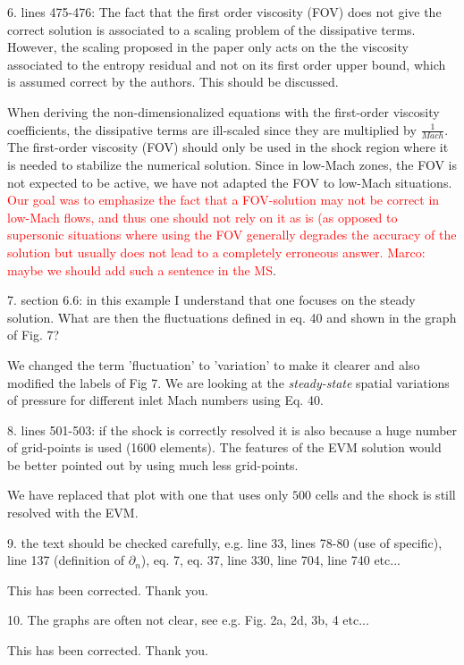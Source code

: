 \documentclass{article}
\newcommand{\tcr}[1]{\textcolor{red}{#1}}
\begin{document}
{
\color{blue}
6. lines 475-476: The fact that the first order viscosity (FOV)  does not give the correct solution is associated to a scaling problem of the dissipative terms. However, the scaling proposed in the paper only acts on the the viscosity associated to the entropy residual and not on its first order upper bound, which is assumed correct by the authors. This should be discussed.
}

When deriving the non-dimensionalized equations with the first-order viscosity coefficients, the dissipative terms are ill-scaled since they are multiplied by $\frac{1}{Mach}$. The first-order viscosity (FOV) should only be used in the shock region where it is needed to stabilize the numerical solution. Since in low-Mach zones, the FOV is not expected to be active, we have not adapted the FOV to low-Mach situations. \tcr{Our goal was to emphasize the fact that a FOV-solution may not be correct in low-Mach flows, and thus one should not rely on it as is (as opposed to supersonic situations where using the FOV generally degrades the accuracy of the solution but usually does not lead to a completely erroneous answer.} \tcr{Marco: maybe we should add such a sentence in the MS}.
\bigskip


{
\color{blue}
7. section 6.6: in this example I understand that one focuses on the steady solution. What are then the fluctuations defined in eq. 40 and shown in the graph of Fig. 7?
}

We changed the term 'fluctuation' to 'variation' to make it clearer and also modified the labels of Fig 7. We are looking at the \emph{steady-state} spatial variations of pressure for different inlet Mach numbers using Eq. 40.
\bigskip


{
\color{blue}
8. lines 501-503: if the shock is correctly resolved it is also because a huge number of grid-points is used (1600 elements). The features  of the EVM solution would be better pointed out by using much less grid-points.
}

We have replaced that plot with one that uses only $500$ cells and the shock is still resolved with the EVM.
\bigskip


{
\color{blue}
9. the text should be checked carefully, e.g. line 33, lines 78-80 (use of specific), line 137 (definition of $\partial_n$), eq. 7, eq. 37, line 330, line 704, line 740 etc...
}

This has been corrected. Thank you.
\bigskip


{
\color{blue}
10. The graphs are often not clear, see e.g. Fig. 2a, 2d, 3b, 4 etc...
}

This has been corrected. Thank you.
\bigskip
\end{document}
